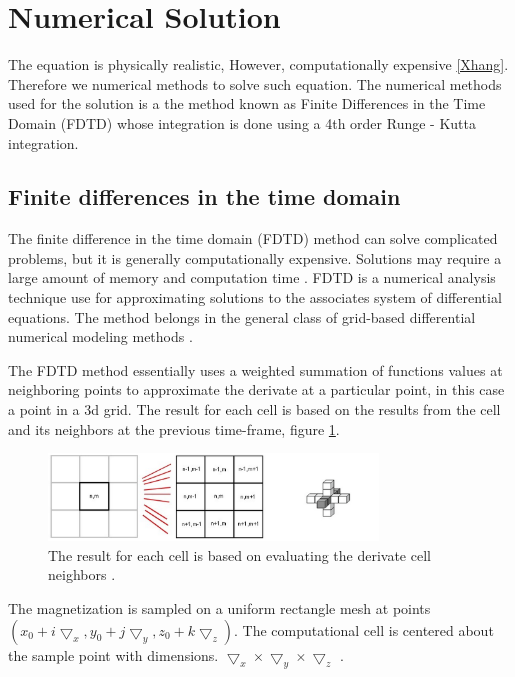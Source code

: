 \section{Numerical Solution}

The equation is physically realistic, However, computationally expensive \ref{Xhang}. Therefore we numerical methods to solve such equation. The numerical methods used for the solution is a the method known as Finite Differences in the Time Domain (FDTD) whose integration is done using a 4th order Runge - Kutta integration.

\subsection{Finite differences in the time domain}

The finite difference in the time domain (FDTD) method can solve complicated problems, but it is generally computationally expensive. Solutions may require a large amount of memory and computation time \cite{ufdtd}. FDTD is a numerical analysis technique use for approximating solutions to the associates system of differential equations. The method belongs in the general class of grid-based differential numerical modeling methods \cite{methods}.

The FDTD method essentially uses a weighted summation of functions values at neighboring points to approximate the derivate at a particular point, in this case a point in a 3d grid. The result for each cell is based on the results from the cell and its neighbors at the previous time-frame, figure \ref{fig:fdtd}.  

\begin{figure}[htbp]
	\centering
		\includegraphics[width=0.78\textwidth]{Figures/fdtd.png}
		\smallskip
	\caption[FDTD grid]{The result for each cell is based on evaluating the derivate cell neighbors \cite{methods}.}
	\label{fig:fdtd}
\end{figure}

The magnetization is sampled on a uniform rectangle mesh at points $(x_0 + i\bigtriangledown_x, y_0 + j\bigtriangledown_y, z_0 + k\bigtriangledown_z)$. The computational cell is centered about the sample point with dimensions. $\bigtriangledown_x \times \bigtriangledown_y \times \bigtriangledown_z$ \cite{methods}.

